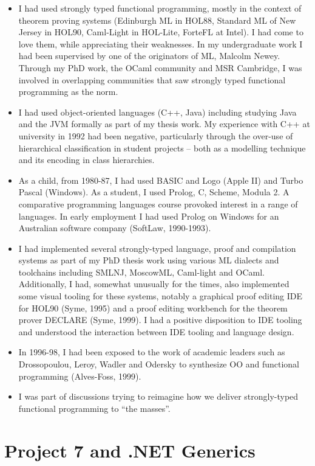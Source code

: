 \documentclass[acmsmall,review]{acmart}\settopmatter{printfolios=true,printccs=false,printacmref=false}
\begin{document}
\begin{itemize}
\item I had used strongly typed functional programming, mostly in the context of theorem proving systems (Edinburgh ML in HOL88, Standard ML of New Jersey in HOL90, Caml-Light in HOL-Lite, ForteFL at Intel). I had come to love them, while appreciating their weaknesses. In my undergraduate work I had been supervised by one of the originators of ML, Malcolm Newey. Through my PhD work, the OCaml community and MSR Cambridge, I was involved in overlapping communities that saw strongly typed functional programming as the norm.
\item I had used object-oriented languages (C++, Java) including studying Java and the JVM formally as part of my thesis work.  My experience with C++ at university in 1992 had been negative, particularly through the over-use of hierarchical classification in student projects – both as a modelling technique and its encoding in class hierarchies.  
\item As a child, from 1980-87, I had used BASIC and Logo (Apple II) and Turbo Pascal (Windows). As a student, I used Prolog, C, Scheme, Modula 2. A comparative programming languages course provoked interest in a range of languages. In early employment I had used Prolog on Windows for an Australian software company (SoftLaw, 1990-1993). 
\item I had implemented several strongly-typed language, proof and compilation systems as part of my PhD thesis work using various ML dialects and toolchains including SMLNJ, MoscowML, Caml-light and OCaml. Additionally, I had, somewhat unusually for the times, also implemented some visual tooling for these systems, notably a graphical proof editing IDE for HOL90 (Syme, 1995) and a proof editing workbench for the theorem prover DECLARE (Syme, 1999).  I had a positive disposition to IDE tooling and understood the interaction between IDE tooling and language design.
\item In 1996-98, I had been exposed to the work of academic leaders such as Drossopoulou, Leroy, Wadler and Odersky to synthesize OO and functional programming (Alves-Foss, 1999).
\item I was part of discussions trying to reimagine how we deliver strongly-typed functional programming to “the masses”.
\end{itemize}

\section*{Project 7 and .NET Generics}
\end{document}

